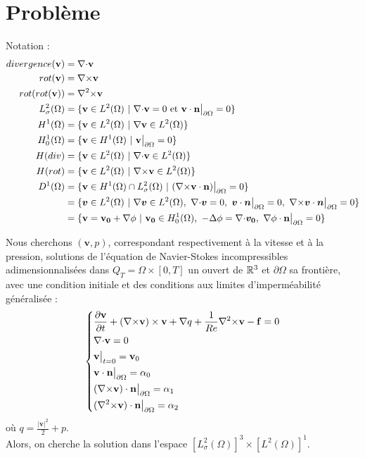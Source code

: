 \chapter{Problème}

Notation :
\begin{align*}
divergence(\mathbf{v})&=\div \mathbf{v}\\
rot(\mathbf{v})&=\rot \mathbf{v}\\
rot(rot(\mathbf{v}))&=\rott \mathbf{v}\\
L^2_\sigma(\Omega) &= \{\mathbf{v} \in L^2(\Omega)\ |\ \div \mathbf{v} = 0\text{ et }\mathbf{v}\cdot \mathbf{n}\restr = 0 \}\\
H^1(\Omega) &= \{\mathbf{v} \in L^2(\Omega)\ |\ \grad \mathbf{v}\in L^2(\Omega)\}\\
H^1_0(\Omega) &= \{\mathbf{v} \in H^1(\Omega)\ |\ \mathbf{v}\restr = 0\}\\
H(div) &= \{\mathbf{v} \in L^2(\Omega)\ |\ \div\mathbf{v} \in L^2(\Omega) \}\\
H(rot) &= \{\mathbf{v} \in L^2(\Omega)\ |\ \rot\mathbf{v} \in L^2(\Omega) \}\\
D^1(\Omega) &= \{\mathbf{v} \in H^1(\Omega)\cap L^2_\sigma(\Omega)\ |\ (\rot \mathbf{v}\cdot \mathbf{n})\restr = 0  \}\\
&=\{\bm{v}\in L^2(\Omega)\ |\ \grad\bm{v}\in L^2(\Omega),\ \div\bm{v}=0,\ \bm{v}\cdot\bm{n}\restr = 0,\ \rot\bm{v}\cdot\bm{n}\restr = 0\}\\
&=\{\mathbf{v}=\mathbf{v_0}+\grad\phi\ |\ \mathbf{v_0}\in H^1_0(\Omega),\ -\laplace\phi=\div\bm{v_0},\ \grad\phi\cdot \mathbf{n}\restr = 0 \}
\end{align*}

Nous cherchons $(\mathbf{v},p)$, correspondant respectivement à la vitesse et à la pression, solutions de l'équation de Navier-Stokes incompressibles adimensionnalisées dans $Q_T=\Omega\times[0,T]$ un ouvert de ${\mathbb{R}}^3$ et $\partial\Omega$ sa frontière, avec une condition initiale et des conditions aux limites d'imperméabilité généralisée :
\begin{equation}\label{depart}
\left\{\begin{aligned}
&\frac{\partial \mathbf{v}}{\partial t} + ({\nabla\times}  \mathbf{v})\times \mathbf{v} + {\nabla} q + \frac{1}{Re}{\nabla^2\times}  \mathbf{v}-\mathbf{f} = 0\\
&{\nabla\cdot} \mathbf{v} = 0\\
&\mathbf{v}\big\rvert_{t=0} = \mathbf{v}_0\\
&\mathbf{v}\cdot \mathbf{n}{\big\rvert_{\partial\Omega}} = \alpha_0\\
&({\nabla\times}  \mathbf{v})\cdot \mathbf{n}{\big\rvert_{\partial\Omega}} = \alpha_1\\
&({\nabla^2\times}  \mathbf{v})\cdot \mathbf{n}{\big\rvert_{\partial\Omega}} = \alpha_2
\end{aligned}\right.
\end{equation}
où $q = \frac{|\mathbf{v}|^2}{2}+p$.\\
Alors, on cherche la solution dans l'espace $[L^2_\sigma(\Omega)]^3\times [L^2(\Omega)]^1$.\\

